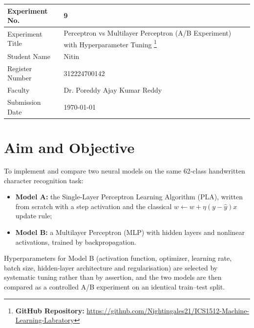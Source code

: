\documentclass[12pt,a4paper]{article}
\DeclareRobustCommand{\_}{\textunderscore\allowbreak}
\begin{document}
\noindent\begin{tabular}{|p{4cm}|p{\dimexpr\linewidth-4cm-4\tabcolsep-3\arrayrulewidth\relax}|}
\hline
Experiment No. & 9 \\ \hline
Experiment Title & Perceptron vs Multilayer Perceptron (A/B Experiment) with Hyperparameter Tuning
\footnote{\textbf{GitHub Repository: }\url{https://github.com/Nightingales21/ICS1512-Machine-Learning-Labratory}}\\ \hline
Student Name & Nitin \\ \hline
Register Number & 312224700142 \\ \hline
Faculty & Dr. Poreddy Ajay Kumar Reddy \\ \hline
Submission Date & \today \\ \hline
\end{tabular}

\section{Aim and Objective}
To implement and compare two neural models on the same 62-class handwritten
character recognition task:
\begin{itemize}[nosep]
\item \textbf{Model A:} the Single-Layer Perceptron Learning Algorithm (PLA),
written from scratch with a step activation and the classical
$w \leftarrow w + \eta(y - \hat{y})x$ update rule;
\item \textbf{Model B:} a Multilayer Perceptron (MLP) with hidden layers and
nonlinear activations, trained by backpropagation.
\end{itemize}
Hyperparameters for Model B (activation function, optimizer, learning rate,
batch size, hidden-layer architecture and regularisation) are selected by
systematic tuning rather than by assertion, and the two models are then
compared as a controlled A/B experiment on an identical train--test split.
\end{document}
